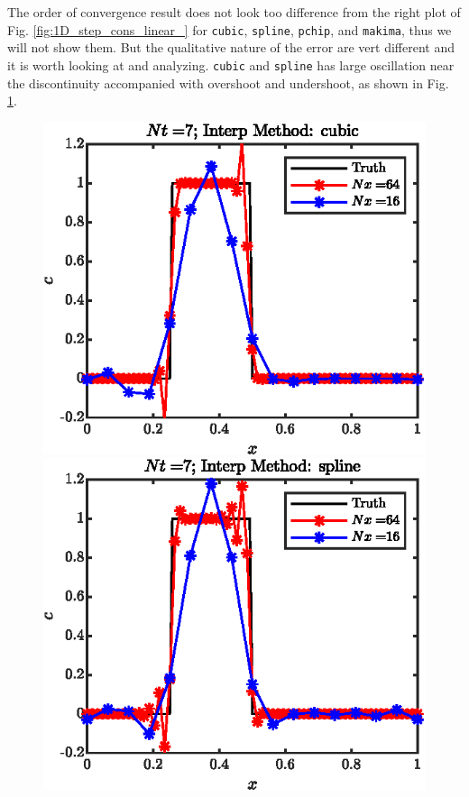 \documentclass[11pt,letterpaper]{article}
\begin{document}
The order of convergence result does not look too difference from the right plot of Fig. \ref{fig:1D_step_cons_linear_} for \texttt{cubic}, \texttt{spline}, \texttt{pchip}, and \texttt{makima}, thus we will not show them. But the qualitative nature of the error are vert different and it is worth looking at and analyzing. \texttt{cubic} and \texttt{spline} has large oscillation near the discontinuity accompanied with overshoot and undershoot, as shown in Fig. \ref{fig:1D_step_cons_cubic_sol}.
\begin{figure}[H]
    \centering
    \includegraphics{figs/1D_step_cons_cubic_sol}
    \includegraphics{figs/1D_step_cons_spline_sol}
    \caption{}\label{fig:1D_step_cons_cubic_sol}
\end{figure}
\end{document}
